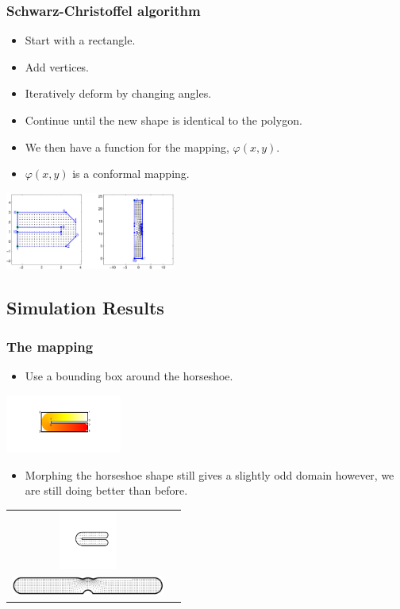 \documentclass[ignorenonframetext]{beamer} %
\newcommand{\bc}{\begin{center}}
\newcommand{\ec}{\end{center}}
\newcommand{\bi}{\begin{itemize}}
\newcommand{\ei}{\end{itemize}}
\begin{document}
\begin{frame}
	\frametitle{Schwarz-Christoffel algorithm}
       \bi
         \item Start with a rectangle.
         \item Add vertices.
         \item Iteratively deform by changing angles.
         \item Continue until the new shape is identical to the polygon.
         \item We then have a function for the mapping, $\varphi(x,y)$.
         \item $\varphi(x,y)$ is a conformal mapping.
        \ei 
      \bc
         \includegraphics[height=1in]{figs/matlab-test-2}
      \ec
\end{frame}

\subsection{Simulation Results}

\begin{frame}
	\frametitle{The mapping}
      \bi
         \item Use a bounding box around the horseshoe.
      \ei
      \bc
         \includegraphics[height=0.75in, trim=1in 1in 1in 0.75in]{figs/hswithboundingbox} 
      \ec
      \bi
         \item Morphing the horseshoe shape still gives a slightly odd domain however, we are still doing better than before.
      \ei
      \bc\begin{tabular}{@{}cc}
          \includegraphics[height=0.75in, trim=1in 1in 0in 0.75in]{figs/hsgridmapping-1} \\ \includegraphics[width=2in, trim=0in 0in 0in 0in]{figs/hsgridmapping-2} \\
       \end{tabular}\ec
\end{frame}
\end{document}
